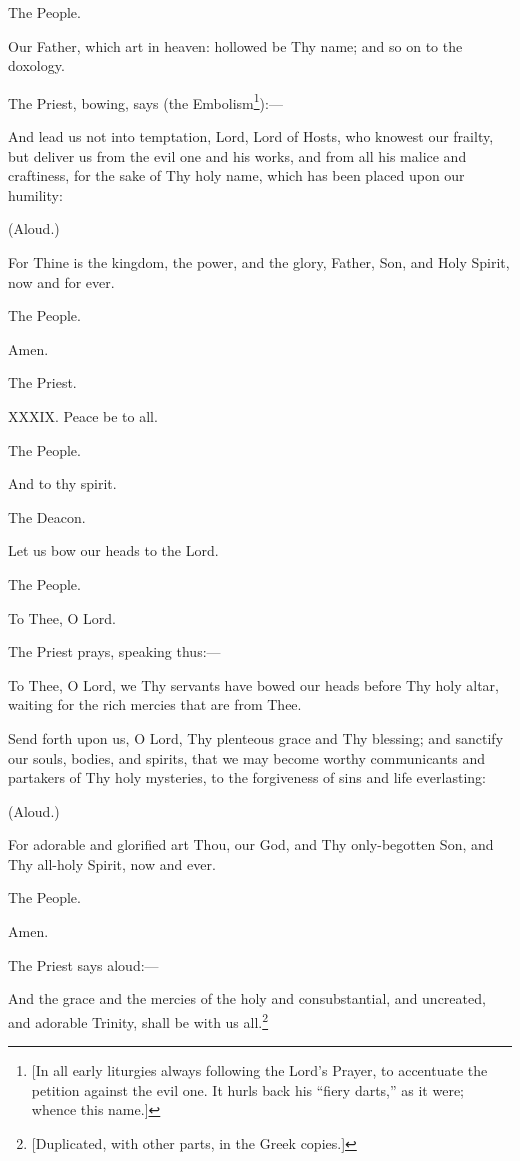 The People.

Our Father, which art in heaven: hollowed be Thy name; and so on to the doxology.

The Priest, bowing, says (the Embolism\footnote{\par{}  [In all early liturgies always following the Lord’s Prayer, to accentuate the petition against the evil one. It hurls back his “fiery darts,” as it were; whence this name.]}):—

And lead us not into temptation, Lord, Lord of Hosts, who knowest our frailty, but deliver us from the evil one and his works, and from all his malice and craftiness, for the sake of Thy holy name, which has been placed upon our humility:

(Aloud.)

For Thine is the kingdom, the power, and the glory, Father, Son, and Holy Spirit, now and for ever.

The People.

Amen.

The Priest.

XXXIX. Peace be to all.

The People.

And to thy spirit.

The Deacon.

Let us bow our heads to the Lord.

The People.

To Thee, O Lord.

The Priest prays, speaking thus:—

To Thee, O Lord, we Thy servants have bowed our heads before Thy holy altar, waiting for the rich mercies that are from Thee.

Send forth upon us, O Lord, Thy plenteous grace and Thy blessing; and sanctify our souls, bodies, and spirits, that we may become worthy communicants and partakers of Thy holy mysteries, to the forgiveness of sins and life everlasting:

(Aloud.)

For adorable and glorified art Thou, our God, and Thy only-begotten Son, and Thy all-holy Spirit, now and ever.

The People.

Amen.

The Priest says aloud:—

And the grace and the mercies of the holy and consubstantial, and uncreated, and adorable Trinity, shall be with us all.\footnote{\par{}  [Duplicated, with other parts, in the Greek copies.]}

